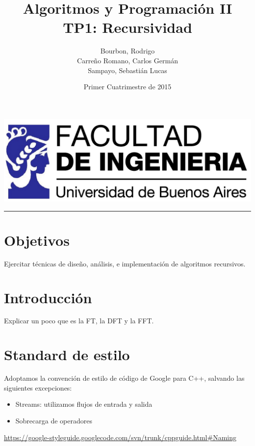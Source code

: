 \documentclass{article}
\begin{document}
\title{Algoritmos y Programación II\\
       TP1: Recursividad}
\author{Bourbon, Rodrigo\\
        Carreño Romano, Carlos Germán\\
        Sampayo, Sebastián Lucas}
\date{Primer Cuatrimestre de 2015}
\maketitle

\begin{center}
  \includegraphics[width=0.5\paperwidth]{Imagenes/logo_fiuba_HD}
  \rule[0.5ex]{0.8\paperwidth}{0.1pt}
\par
\end{center}



\newpage{}
\vfill{}
\tableofcontents{}
\vfill{}
\newpage{}


\section{Objetivos}
  Ejercitar técnicas de diseño, análisis, e implementación de algoritmos recursivos.

\section{Introducción}
  Explicar un poco que es la FT, la DFT y la FFT.

\section{Standard de estilo}
  Adoptamos la convención de estilo de código de Google para C++, salvando las siguientes excepciones:
  \begin{itemize}
    \item Streams: utilizamos flujos de entrada y salida
    \item Sobrecarga de operadores
  \end{itemize}
  \url{https://google-styleguide.googlecode.com/svn/trunk/cppguide.html#Naming}
\end{document}

